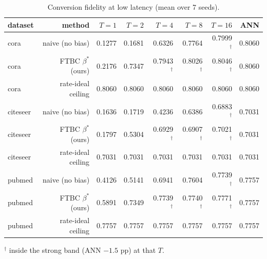 \begin{table}[t]
\centering
\small
\caption{Conversion fidelity at low latency (mean over 7 seeds).}
\label{tab:fidelity}
\begin{tabular}{lrrrrrrr}
\toprule
dataset & method & $T=1$ & $T=2$ & $T=4$ & $T=8$ & $T=16$ & ANN \\
\midrule
cora & naive (no bias) & 0.1277 & 0.1681 & 0.6326 & 0.7764 & 0.7999$^{\dagger}$ & 0.8060 \\
cora & FTBC $\beta^{*}$ (ours) & 0.2176 & 0.7347 & 0.7943$^{\dagger}$ & 0.8026$^{\dagger}$ & 0.8046$^{\dagger}$ & 0.8060 \\
cora & rate-ideal ceiling & 0.8060 & 0.8060 & 0.8060 & 0.8060 & 0.8060 & 0.8060 \\
citeseer & naive (no bias) & 0.1636 & 0.1719 & 0.4236 & 0.6386 & 0.6883$^{\dagger}$ & 0.7031 \\
citeseer & FTBC $\beta^{*}$ (ours) & 0.1797 & 0.5304 & 0.6929$^{\dagger}$ & 0.6907$^{\dagger}$ & 0.7021$^{\dagger}$ & 0.7031 \\
citeseer & rate-ideal ceiling & 0.7031 & 0.7031 & 0.7031 & 0.7031 & 0.7031 & 0.7031 \\
pubmed & naive (no bias) & 0.4126 & 0.5141 & 0.6941 & 0.7604 & 0.7739$^{\dagger}$ & 0.7757 \\
pubmed & FTBC $\beta^{*}$ (ours) & 0.5891 & 0.7349 & 0.7739$^{\dagger}$ & 0.7740$^{\dagger}$ & 0.7771$^{\dagger}$ & 0.7757 \\
pubmed & rate-ideal ceiling & 0.7757 & 0.7757 & 0.7757 & 0.7757 & 0.7757 & 0.7757 \\
\bottomrule
\end{tabular}
\par\vspace{2pt}\footnotesize $^{\dagger}$ inside the strong band (ANN $-1.5$ pp) at that $T$.
\end{table}
